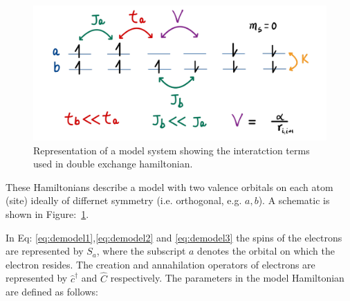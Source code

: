 \documentclass[12pt,twoside]{report}
\begin{document}
	
	
	\begin{figure}[ht]
		\centering
			\includegraphics[scale=0.2]{DE.png}
		\caption{\label{fig:deham} Representation of a model system showing the interatction terms used in double exchange hamiltonian. }
	\end{figure}
	These Hamiltonians describe a model with two valence orbitals on each
	atom (site) ideally of differnet symmetry (i.e. orthogonal, e.g. $a,b$). A schematic is shown in
	Figure:~\ref{fig:deham}.
			
			
	In Eq: \ref{eq:demodel1},\ref{eq:demodel2} and \ref{eq:demodel3} the spins of the electrons are represented by $S_a$,
	where the subscript $a$ denotes the orbital on which the electron resides.  The
	creation and annahilation operators of electrons are represented by
	$\hat{c}^{\dagger}$ and $\hat{C}$ respectively. The parameters in the model
	Hamiltonian are defined as follows:
	
\end{document}
